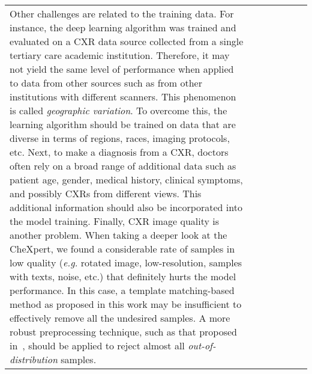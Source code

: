 \documentclass[review]{elsarticle}
\begin{document}
\begin{frontmatter}
{\begin{table}
\begin{tabular}{p{2.25cm}p{1.3cm}p{1.3cm}p{1.2cm}p{1.2cm}p{1.3cm}p{0.9cm}}
Other challenges are related to the training data. For instance, the deep learning algorithm was trained and evaluated on a CXR data source collected from a single tertiary care academic institution. Therefore, it may not yield the same level of performance when applied to data from other sources such as from other institutions with different scanners. This phenomenon is called \textit{geographic variation}. To overcome this, the learning algorithm should be trained on data that are diverse in terms of regions, races, imaging protocols, etc. Next, to make a diagnosis from a CXR, doctors often rely on a broad range of additional data such as patient age, gender, medical history, clinical symptoms, and possibly CXRs from different views. This additional information should also be incorporated into the model training. Finally, CXR image quality is another problem. When taking a deeper look at the CheXpert, we found a considerable rate of samples in low quality (\textit{e.g.} rotated image, low-resolution, samples with texts, noise, etc.) that definitely hurts the model performance. In this case, a template matching-based method as proposed in this work may be insufficient to effectively remove all the undesired samples. A more robust preprocessing technique, such as that proposed in~\cite{ccalli2019frodo}, should be applied to reject almost all \textit{out-of-distribution} samples.


\end{tabular}
\end{table}}
\end{frontmatter}
\end{document}
